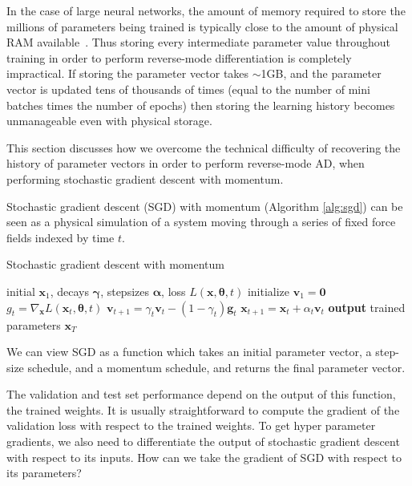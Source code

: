 \documentclass{article}
\newcommand{\vx}{\mathbf{x}}
\newcommand{\vv}{\mathbf{v}}
\newcommand{\vg}{\mathbf{g}}
\newcommand{\vzero}{\mathbf{0}}
\newcommand{\hypers}{{\boldsymbol{\theta}}}
\newcommand{\params}{\vx}
\newcommand{\decay}{\gamma}
\newcommand{\decays}{{\boldsymbol{\decay}}}
\newcommand{\stepsize}{\alpha}
\newcommand{\stepsizes}{{\boldsymbol{\stepsize}}}
\newcommand{\gradparams}{\nabla_\params L(\params_t, \hypers, t)}
\begin{document}
In the case of large neural networks, the amount of memory required to store the millions of parameters being trained is typically close to the amount of physical RAM available~\cite{sequence2014}.
Thus storing every intermediate parameter value throughout training in order to perform reverse-mode differentiation is completely impractical.
If storing the parameter vector takes $\sim$1GB, and the parameter vector is updated tens of thousands of times (equal to the number of mini batches times the number of epochs) then storing the learning history becomes unmanageable even with physical storage.

This section discusses how we overcome the technical difficulty of recovering the history of parameter vectors in order to perform reverse-mode AD, when performing stochastic gradient descent with momentum.

Stochastic gradient descent (SGD) with momentum (Algorithm \ref{alg:sgd}) can be seen as a physical simulation of a system moving through a series of fixed force fields indexed by time $t$.

%
\begin{algorithm}
   \caption{Stochastic gradient descent with momentum}
   \label{alg:sgd}
\begin{algorithmic}[1]
    initial $\vx_1$, decays $\decays$, stepsizes $\stepsizes$, loss $L(\params, \hypers, t)$
   \State initialize $\vv_1 = \vzero$
   \State $g_t = \gradparams$ 
   \State $\vv_{t+1} = \decay_t \vv_t - (1 - \decay_t) \vg_t$   \label{step:update velocity}
   \State $\vx_{t+1} = \vx_t + \stepsize_t \vv_t$  \label{step:update position}
   \EndFor
   \State \textbf{output} trained parameters $\vx_T$
\end{algorithmic}
\end{algorithm}
%

We can view SGD as a function which takes an initial parameter vector, a step-size schedule, and a momentum schedule, and returns the final parameter vector.

The validation and test set performance depend on the output of this function, the trained weights.
It is usually straightforward to compute the gradient of the validation loss with respect to the trained weights.
To get hyper parameter gradients, we also need to differentiate the output of stochastic gradient descent with respect to its inputs.
How can we take the gradient of SGD with respect to its parameters?
\end{document}
